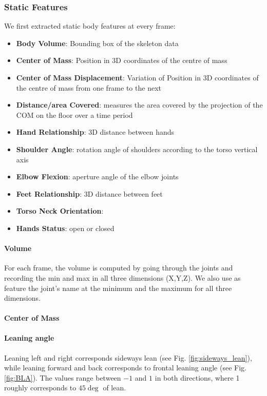 \documentclass[a4paper,twocolumn]{svjour3}
\begin{document}
\subsubsection{Static Features}
We first extracted static body features at every frame:
\begin{itemize}[noitemsep,nolistsep]
\item \textbf{Body Volume}: Bounding box of the skeleton data
\item \textbf{Center of Mass}: Position in 3D coordinates of the centre of mass 
\item \textbf{Center of Mass Displacement}: Variation of Position in 3D coordinates of the centre of mass from one frame to the next
\item \textbf{Distance/area Covered}: measures the area covered by the projection of the COM on the floor over a time period
\item \textbf{Hand Relationship}: 3D distance between hands
\item \textbf{Shoulder Angle}: rotation angle of shoulders according to the torso vertical axis
\item \textbf{Elbow Flexion}: aperture angle of the elbow joints
\item \textbf{Feet Relationship}: 3D distance between feet
\item \textbf{Torso Neck Orientation}: %
\item \textbf{Hands Status}: open or closed 
\end{itemize}

\paragraph{Volume}
For each frame, the volume is computed by going through the joints and recording the min and max in all three dimensions (X,Y,Z). 
We also use as feature the joint's name at the minimum and the maximum for all three dimensions.

\paragraph{Center of Mass}

\paragraph{Leaning angle}
Leaning left and right corresponds sideways lean (see Fig. \ref{fig:sideways_lean}), while leaning forward and back corresponds to frontal leaning angle (see Fig. \ref{fig:BLA}). 
The values range between $-1$ and $1$ in both directions, where 1 roughly corresponds to $45\deg$ of lean.
\end{document}
